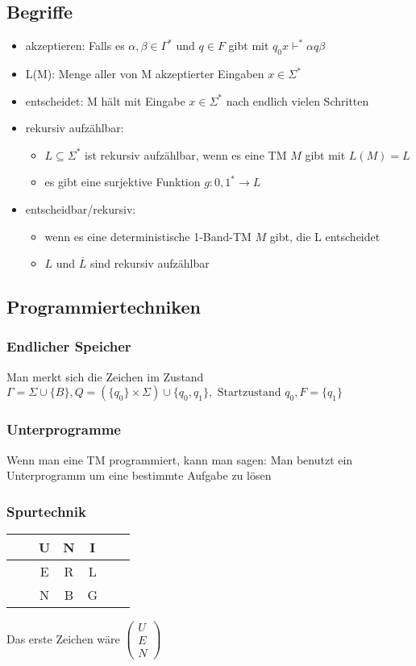 \documentclass{article}
\begin{document}
\subsection{Begriffe}
\begin{itemize}
	\item akzeptieren: Falls es $\alpha, \beta \in \Gamma^*$ und $q\in F$ gibt mit $q_0x\vdash^*\alpha q \beta$
	\item L(M): Menge aller von M akzeptierter Eingaben $x\in\Sigma^*$
	\item entscheidet: M hält mit Eingabe $x\in \Sigma^*$ nach endlich vielen Schritten 
	\item rekursiv aufzählbar: 
		\begin{itemize}
			\item $L\subseteq \Sigma^*$ ist rekursiv aufzählbar, wenn es eine TM $M$ gibt mit $L(M)=L$
			\item es gibt eine surjektive Funktion $g:{0, 1}^*\to L$
		\end{itemize}
	\item entscheidbar/rekursiv: 
		\begin{itemize} 
			\item wenn es eine deterministische 1-Band-TM $M$ gibt, die L entscheidet
			\item $L$ und $\overline{L}$ sind rekursiv aufzählbar
		\end{itemize}
\end{itemize}
\subsection{Programmiertechniken}
\subsubsection{Endlicher Speicher}
Man merkt sich die Zeichen im Zustand \newline
$\Gamma=\Sigma\cup\{B\}, Q=(\{q_0\}\times\Sigma)\cup\{q_0, q_1\}, \text{ Startzustand } q_0, F=\{q_1\}$
\subsubsection{Unterprogramme}
Wenn man eine TM \glqq{}programmiert\grqq{}, kann man sagen: Man benutzt ein Unterprogramm um eine bestimmte Aufgabe zu lösen
\subsubsection{Spurtechnik}
\begin{tabular}{cc|c|c|c|cc}
	\hline
	&&U&N&I&&\\
	\hline
	&&E&R&L&&\\
	\hline
	&&N&B&G&&\\
	\hline
\end{tabular} \newline
Das erste Zeichen wäre $\begin{pmatrix}
	U\\
	E\\
	N
\end{pmatrix}$
\end{document}
